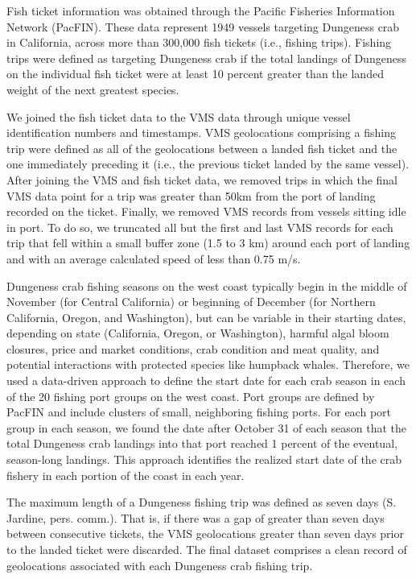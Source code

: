 \documentclass[9pt,twocolumn,twoside,lineno]{pnas-new}
\begin{document}
Fish ticket information was obtained through the Pacific Fisheries
Information Network (PacFIN). These data represent 1949 vessels
targeting Dungeness crab in California, across more than 300,000 fish
tickets (i.e., fishing trips). Fishing trips were defined as targeting
Dungeness crab if the total landings of Dungeness on the individual fish
ticket were at least 10 percent greater than the landed weight of the
next greatest species.

We joined the fish ticket data to the VMS data through unique vessel
identification numbers and timestamps. VMS geolocations comprising a
fishing trip were defined as all of the geolocations between a landed
fish ticket and the one immediately preceding it (i.e., the previous
ticket landed by the same vessel). After joining the VMS and fish ticket
data, we removed trips in which the final VMS data point for a trip was
greater than 50km from the port of landing recorded on the ticket.
Finally, we removed VMS records from vessels sitting idle in port. To do
so, we truncated all but the first and last VMS records for each trip
that fell within a small buffer zone (1.5 to 3 km) around each port of
landing and with an average calculated speed of less than 0.75 m/s.

Dungeness crab fishing seasons on the west coast typically begin in the
middle of November (for Central California) or beginning of December
(for Northern California, Oregon, and Washington), but can be variable
in their starting dates, depending on state (California, Oregon, or
Washington), harmful algal bloom closures, price and market conditions,
crab condition and meat quality, and potential interactions with
protected species like humpback whales. Therefore, we used a data-driven
approach to define the start date for each crab season in each of the 20
fishing port groups on the west coast. Port groups are defined by PacFIN
and include clusters of small, neighboring fishing ports. For each port
group in each season, we found the date after October 31 of each season
that the total Dungeness crab landings into that port reached 1 percent
of the eventual, season-long landings. This approach identifies the
realized start date of the crab fishery in each portion of the coast in
each year.

The maximum length of a Dungeness fishing trip was defined as seven days
(S. Jardine, pers. comm.). That is, if there was a gap of greater than
seven days between consecutive tickets, the VMS geolocations greater
than seven days prior to the landed ticket were discarded. The final
dataset comprises a clean record of geolocations associated with each
Dungeness crab fishing trip.
\end{document}
